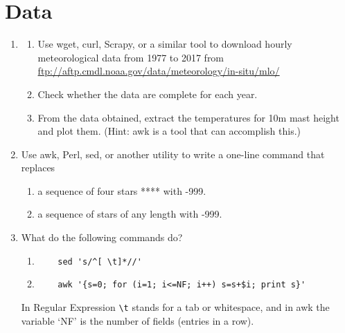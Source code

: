 \documentclass{article}
\begin{document}
\section{Data}
\begin{enumerate}
  
\item \label{exrc:wgetmlo} 
  \begin{enumerate}\setlength{\itemsep}{0pt}
  \item Use wget, curl, Scrapy, or a similar tool to download hourly meteorological data from 1977 to 2017 from \url{ftp://aftp.cmdl.noaa.gov/data/meteorology/in-situ/mlo/}

  \item Check whether the data are complete for each year.
    
  \item From the data obtained, extract the temperatures for 10m mast height and plot them.
    (Hint: awk is a tool that can accomplish this.)
  \end{enumerate}


\item Use awk, Perl, sed, or another utility to write a one-line command that replaces
  \begin{enumerate}\setlength{\itemsep}{0pt}
  \item a sequence of four stars **** with -999.
  \item a sequence of stars of any length with -999.
  \end{enumerate}


\item What do the following commands do?
  \begin{enumerate}\setlength{\itemsep}{0pt}
  \item
\begin{verbatim}
    sed 's/^[ \t]*//' 
\end{verbatim}
  \item
\begin{verbatim}
    awk '{s=0; for (i=1; i<=NF; i++) s=s+$i; print s}'
\end{verbatim}
\end{enumerate}
In Regular Expression \verb+\t+ stands for a tab or whitespace,
and in awk the variable `NF' is the number of fields (entries in a row).


\end{enumerate}
\end{document}
